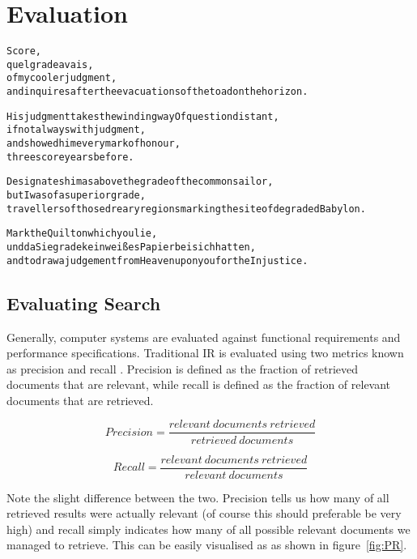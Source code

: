 
\chapter{Evaluation}
\label{ch:evaluation}

\startcontents[chapters]

\vfill

\begin{alltt}\sffamily
Score,
quel grade avais,
of my cooler judgment,
and inquires after the evacuations of the toad on the horizon.

His judgment takes the winding way Of question distant,
if not always with judgment,
and showed him every mark of honour,
three score years before.

Designates him as above the grade of the common sailor,
but I was of a superior grade,
travellers of those dreary regions marking the site of degraded Babylon.

Mark the Quilt on which you lie,
und da Sie grade kein weißes Papier bei sich hatten,
and to draw a judgement from Heaven upon you for the Injustice.
\end{alltt}

\newpage
\minicontents
\spirals

\section{Evaluating Search}
\label{s:evalsearch}

Generally, computer systems are evaluated against functional requirements and performance specifications. Traditional \ac{IR} is evaluated using two metrics known as precision and recall \autocite{Baeza-Yates2011}. Precision is defined as the fraction of retrieved documents that are relevant, while recall is defined as the fraction of relevant documents that are retrieved.

\begin{equation}
  Precision = \frac{relevant \ documents \ retrieved}{retrieved \ documents}
  \label{eq:precision}
\end{equation}

\begin{equation}
  Recall = \frac{relevant \ documents \ retrieved}{relevant \ documents}
\label{eq:recall}
\end{equation}

Note the slight difference between the two. Precision tells us how many of all retrieved results were actually relevant (of course this should preferable be very high) and recall simply indicates how many of all possible relevant documents we managed to retrieve. This can be easily visualised as as shown in figure~\ref{fig:PR}.

